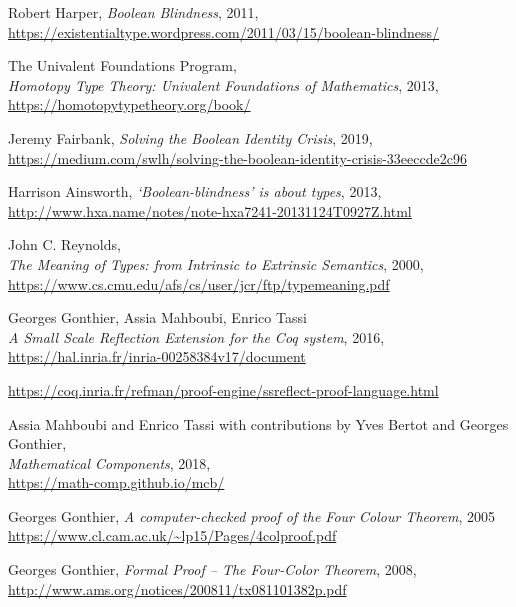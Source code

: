 \documentclass[declaration,mgr,english,shortabstract]{iithesis}
\begin{document}
\begin{thebibliography}{1}
    Robert Harper,
    \textit{Boolean Blindness},
    2011, \\
    \url{https://existentialtype.wordpress.com/2011/03/15/boolean-blindness/}

    The Univalent Foundations Program, \\
    \textit{Homotopy Type Theory: Univalent Foundations of Mathematics},
    2013, \\
    \url{https://homotopytypetheory.org/book/}

    Jeremy Fairbank,
    \textit{Solving the Boolean Identity Crisis},
    2019, \\
    \url{https://medium.com/swlh/solving-the-boolean-identity-crisis-33eeccde2c96}

    Harrison Ainsworth,
    \textit{‘Boolean-blindness’ is about types},
    2013, \\
    \url{http://www.hxa.name/notes/note-hxa7241-20131124T0927Z.html}

    John C. Reynolds, \\
    \textit{The Meaning of Types: from Intrinsic to Extrinsic Semantics},
    2000, \\
    \url{https://www.cs.cmu.edu/afs/cs/user/jcr/ftp/typemeaning.pdf}

    Georges Gonthier, Assia Mahboubi, Enrico Tassi \\
    \textit{A Small Scale Reflection Extension for the Coq system}, 2016, \\
    \url{https://hal.inria.fr/inria-00258384v17/document}

    \url{https://coq.inria.fr/refman/proof-engine/ssreflect-proof-language.html}
    
    Assia Mahboubi and Enrico Tassi with contributions by Yves Bertot and Georges Gonthier, \\
    \textit{Mathematical Components}, 2018, \\
    \url{https://math-comp.github.io/mcb/}

    Georges Gonthier,
    \textit{A computer-checked proof of the Four Colour Theorem}, 2005 \\
    \url{https://www.cl.cam.ac.uk/~lp15/Pages/4colproof.pdf}

    Georges Gonthier,
    \textit{Formal Proof -- The Four-Color Theorem}, 2008, \\
    \url{http://www.ams.org/notices/200811/tx081101382p.pdf}


\end{thebibliography}
\end{document}
